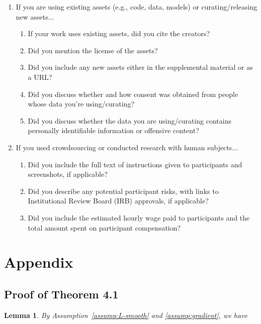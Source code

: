 \documentclass{article}
\newtheorem{lemma}{Lemma}[section]
\begin{document}
\begin{enumerate}
\item If you are using existing assets (e.g., code, data, models) or curating/releasing new assets...
\begin{enumerate}
  \item If your work uses existing assets, did you cite the creators?
  \item Did you mention the license of the assets?
    \answerNA{}
  \item Did you include any new assets either in the supplemental material or as a URL?
    \answerNA{}
  \item Did you discuss whether and how consent was obtained from people whose data you're using/curating?
    \answerNA{}
  \item Did you discuss whether the data you are using/curating contains personally identifiable information or offensive content?
    \answerNA{}
\end{enumerate}

\item If you used crowdsourcing or conducted research with human subjects...
\begin{enumerate}
  \item Did you include the full text of instructions given to participants and screenshots, if applicable?
    \answerNA{}
  \item Did you describe any potential participant risks, with links to Institutional Review Board (IRB) approvals, if applicable?
    \answerNA{}
  \item Did you include the estimated hourly wage paid to participants and the total amount spent on participant compensation?
    \answerNA{}
\end{enumerate}

\end{enumerate}

\newpage

\appendix
\section{Appendix}
\subsection{Proof of Theorem 4.1} \label{appendix:proof}
\begin{lemma}\label{lemma:pre}
By Assumption~\ref{assump:L-smooth} and \ref{assump:gradient}, we have

\end{lemma}
\end{document}
